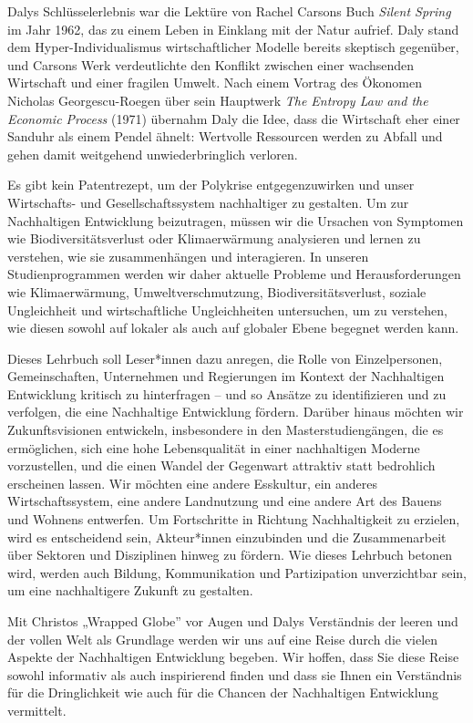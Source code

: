 \documentclass[
  nswissgerman,
  a4paper,
  DIV=11,
  numbers=noendperiod,
  oneside,
  openany]{scrreprt}
\begin{document}
Dalys Schlüsselerlebnis war die Lektüre von Rachel Carsons Buch
\emph{Silent Spring} im Jahr 1962, das zu einem Leben in Einklang mit
der Natur aufrief. Daly stand dem Hyper-Individualismus wirtschaftlicher
Modelle bereits skeptisch gegenüber, und Carsons Werk verdeutlichte den
Konflikt zwischen einer wachsenden Wirtschaft und einer fragilen Umwelt.
Nach einem Vortrag des Ökonomen Nicholas Georgescu-Roegen über sein
Hauptwerk \emph{The Entropy Law and the Economic Process} (1971)
übernahm Daly die Idee, dass die Wirtschaft eher einer Sanduhr als einem
Pendel ähnelt: Wertvolle Ressourcen werden zu Abfall und gehen damit
weitgehend unwiederbringlich verloren.

Es gibt kein Patentrezept, um der Polykrise entgegenzuwirken und unser
Wirtschafts- und Gesellschaftssystem nachhaltiger zu gestalten. Um zur
Nachhaltigen Entwicklung beizutragen, müssen wir die Ursachen von
Symptomen wie Biodiversitätsverlust oder Klimaerwärmung analysieren und
lernen zu verstehen, wie sie zusammenhängen und interagieren. In unseren
Studienprogrammen werden wir daher aktuelle Probleme und
Herausforderungen wie Klimaerwärmung, Umweltverschmutzung,
Biodiversitätsverlust, soziale Ungleichheit und wirtschaftliche
Ungleichheiten untersuchen, um zu verstehen, wie diesen sowohl auf
lokaler als auch auf globaler Ebene begegnet werden kann.

Dieses Lehrbuch soll Leser*innen dazu anregen, die Rolle von
Einzelpersonen, Gemeinschaften, Unternehmen und Regierungen im Kontext
der Nachhaltigen Entwicklung kritisch zu hinterfragen -- und so Ansätze
zu identifizieren und zu verfolgen, die eine Nachhaltige Entwicklung
fördern. Darüber hinaus möchten wir Zukunftsvisionen entwickeln,
insbesondere in den Masterstudiengängen, die es ermöglichen, sich eine
hohe Lebensqualität in einer nachhaltigen Moderne vorzustellen, und die
einen Wandel der Gegenwart attraktiv statt bedrohlich erscheinen lassen.
Wir möchten eine andere Esskultur, ein anderes Wirtschaftssystem, eine
andere Landnutzung und eine andere Art des Bauens und Wohnens entwerfen.
Um Fortschritte in Richtung Nachhaltigkeit zu erzielen, wird es
entscheidend sein, Akteur*innen einzubinden und die Zusammenarbeit über
Sektoren und Disziplinen hinweg zu fördern. Wie dieses Lehrbuch betonen
wird, werden auch Bildung, Kommunikation und Partizipation unverzichtbar
sein, um eine nachhaltigere Zukunft zu gestalten.

Mit Christos „Wrapped Globe'' vor Augen und Dalys Verständnis der leeren
und der vollen Welt als Grundlage werden wir uns auf eine Reise durch
die vielen Aspekte der Nachhaltigen Entwicklung begeben. Wir hoffen,
dass Sie diese Reise sowohl informativ als auch inspirierend finden und
dass sie Ihnen ein Verständnis für die Dringlichkeit wie auch für die
Chancen der Nachhaltigen Entwicklung vermittelt.
\end{document}
